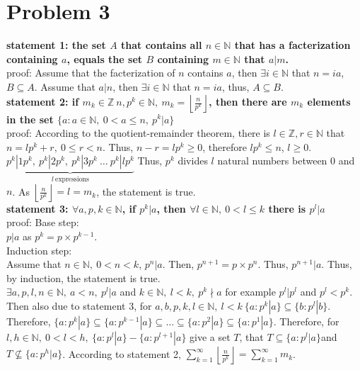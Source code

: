 \documentclass{article}
\begin{document}
\section*{Problem 3}
\textbf{statement 1: the set \(A\) that contains all $n\in\mathbb{N}$ that has a facterization containing $a$, equals the set \(B\) containing \(m\in\mathbb{N}\) that $a|m$.}\\
proof: Assume that the facterization of $n$ contains $a$, then $\exists i\in \mathbb{N}$ that $n=ia$, \(B\subseteq A\).
Assume that $a|n$, then $\exists i\in \mathbb{N}$ that $n=ia$, thus, \(A\subseteq B\).\\
\textbf{statement 2: if \(m_k\in \mathbb{Z}\ n,p^k\in \mathbb{N},\ m_k=\displaystyle{\left\lfloor \frac{n}{p^k}\right\rfloor}\), then there are \(m_k\) elements in the set \(\{a:a\in \mathbb{N},\ 0<a\leqslant n,\ p^k|a\}\)}\\
proof: According to the quotient-remainder theorem, there is \(l\in\mathbb{Z}, r\in \mathbb{N}\) that \(n=lp^k+r,\ 0\leqslant r<n\). 
Thus, \(n-r=lp^k\geqslant0\), therefore \(lp^k\leqslant n\), \(l\geqslant 0\). \(\underbrace{p^k|1 p^k,\ p^k|2 p^k,\ p^k|3 p^k\ \dots\ p^k|l p^k }_{l \ \text{expressions}}\)
Thus, \(p^k\) divides \(l\)  natural numbers between 0 and \(n\). As \(\displaystyle{\left\lfloor \frac{n}{p^k}\right\rfloor}=l=m_k\), the statement is true.\\
\textbf{statement 3: \(\forall a, p,k\in \mathbb{N}\), if \(p^k|a\), then \(\forall l\in \mathbb{N},\ 0<l\leqslant k\) there is \(p^l|a\)}\\
proof: Base step:\\
\(p|a\) as \(p^k=p\times p^{k-1}\).\\
Induction step:\\
Assume that \(n\in\mathbb{N},\ 0<n< k\), \(p^n|a\). Then, \(p^{n+1}=p\times p^n\). Thus, \(p^{n+1}|a\).
Thus, by induction, the statement is true.\\ \newline
\(\exists a,p,l,n\in \mathbb{N},\ a<n, \  p^l|a\) and \(k\in\mathbb{N},\ l<k,\ p^k\nmid a\) for example \(p^l|p^l\) and \(p^l<p^k\). Then also due to statement 3, for
\(a,b,p,k,l\in\mathbb{N},\ l<k\ \{a:p^k|a\}\subseteq\{b:p^l|b\} \). Therefore, \(\{a:p^k|a\}\subseteq\{a:p^{k-1}|a\}\subseteq\dots\subseteq\{a:p^2|a\}\subseteq\{a:p^1|a\}\).
Therefore, for \(l,h\in \mathbb{N},\ 0<l<h,\ \{a:p^l|a\}-\{a:p^{l+1}|a\}\) give a set \(T\), that \(T\subseteq\{a:p^l|a\}\)and \(T\nsubseteq\{a:p^h|a\}\). 
According to statement 2, \(\displaystyle{\sum^\infty_{k=1}\left\lfloor \frac{n}{p^k}\right\rfloor=\sum^\infty_{k=1}m_k}\).
\end{document}
